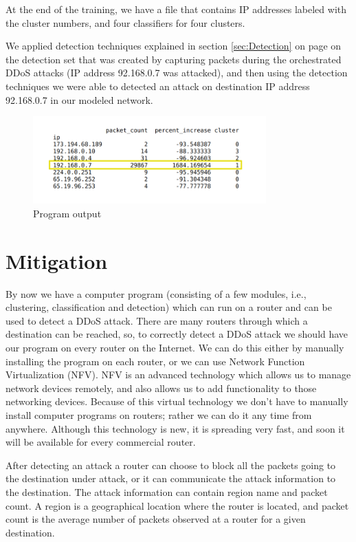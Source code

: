 \documentclass[12pt,oneside,a4paper]{article}
\begin{document}
At the end of the training, we have a file that contains IP addresses labeled with the cluster numbers, and four classifiers for four clusters.

We applied detection techniques explained in section \ref{sec:Detection} on page \pageref{sec:Detection} on the detection set that was created by capturing packets during the orchestrated DDoS attacks (IP address 92.168.0.7 was attacked), and then using the detection techniques we were able to detected an attack on destination IP address 92.168.0.7 in our modeled network.

\begin{figure}[H]
\centering
\includegraphics[width=0.80\textwidth]{detected_IP.png}
\caption{Program output} \label{fig:detected_IP}
\end{figure}

\pagebreak
\section{Mitigation}

By now we have a computer program (consisting of a few modules, i.e., clustering, classification and detection) which can run on a router and can be used to detect a DDoS attack. There are many routers through which a destination can be reached, so, to correctly detect a DDoS attack we should have our program on every router on the Internet. We can do this either by manually installing the program on each router, or we can use Network Function Virtualization (NFV)\cite{nfv}. NFV is an advanced technology which allows us to manage network devices remotely, and also allows us to add functionality to those networking devices. Because of this virtual technology we don't have to manually install computer programs on routers; rather we can do it any time from anywhere. Although this technology is new, it is spreading very fast, and soon it will be available for every commercial router.

After detecting an attack a router can choose to block all the packets going to the destination under attack, or it can communicate the attack information to the destination. The attack information can contain region name and packet count. A region is a geographical location where the router is located, and packet count is the average number of packets observed at a router for a given destination.
\end{document}
